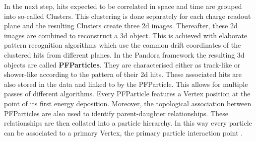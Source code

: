 In the next step, hits expected to be correlated in space and time are grouped into so-called \glspl{Cluster}. This clustering is done separately for each charge readout plane and the resulting \glspl{Cluster} create three \gls{2d} images. Thereafter, these \gls{2d} images are combined to reconstruct a \gls{3d} object. This is achieved with elaborate pattern recognition algorithms which use the common drift coordinates of the clustered hits from different planes. In the \gls{Pandora} framework the resulting \gls{3d} objects are called \textbf{PFParticles}. They are characterised either as track-like or shower-like according to the pattern of their \gls{2d} hits. These associated hits are also stored in the data and linked to by the PFParticle. This allows for multiple passes of different algorithms. Every PFParticle features a \gls{Vertex} position at the point of its first energy deposition. Moreover, the topological association between PFParticles are also used to identify parent-daughter relationships. These relationships are then collated into a particle hierarchy. In this way every particle can be associated to a primary \gls{Vertex}, \ie the primary particle interaction point \cite{PandoraLAr}. 


